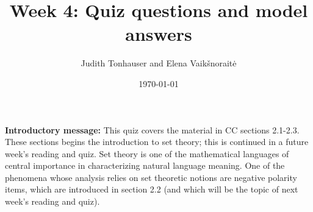 \documentclass[a4,11pt]{article}
\title{Week 4: Quiz questions and model answers}
\author{Judith Tonhauser and Elena Vaik\v snorait\.{e} }
\date{\today}
\begin{document}
\maketitle

{\bf Introductory message:} This quiz covers the material in CC sections 2.1-2.3. These sections begins the introduction to set theory; this is continued in a future week's reading and quiz. Set theory is one of the mathematical languages of central importance in characterizing natural language meaning. One of the phenomena whose analysis relies on set theoretic notions are negative polarity items, which are introduced in section 2.2 (and which will be the topic of next week's reading and quiz).



\end{document}
